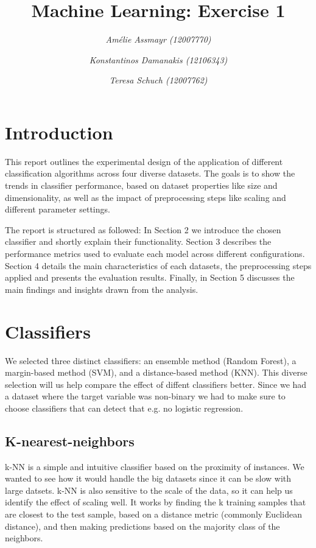 \documentclass{article}
\title{\textbf{Machine Learning: Exercise 1}}
\author{\textit{Amélie Assmayr (12007770)} \and
        \textit{Konstantinos Damanakis (12106343)} \and
        \textit{Teresa Schuch (12007762)}}
\date{}
\begin{document}
\maketitle
\vspace{-20pt}

\section{Introduction}
This report outlines the experimental design of the application of different classification algorithms across four diverse datasets. The goals is to show the trends in classifier performance, based on dataset properties like size and dimensionality, as well as the impact of preprocessing steps like scaling and different parameter settings.

The report is structured as followed: In Section 2 we introduce the chosen classifier and shortly explain their functionality. Section 3 describes the performance metrics used to evaluate each model across different configurations. Section 4 details the main characteristics of each datasets, the preprocessing steps applied and presents the evaluation results. Finally, in Section 5 discusses the main findings and insights drawn from the analysis.

\section{Classifiers}
We selected three distinct classifiers: an ensemble method (Random Forest), a margin-based method (SVM), and a distance-based method (KNN). This diverse selection will us help compare the effect of diffent classifiers better. Since we had a dataset where the target variable was non-binary we had to make sure to choose classifiers that can detect that e.g. no logistic regression.

\subsection{K-nearest-neighbors}
k-NN is a simple and intuitive classifier based on the proximity of instances. We wanted to see how it would handle the big datasets since it can be slow with large datsets. k-NN is also sensitive to the scale of the data, so it can help us identify the effect of scaling well. It works by finding the k training samples that are closest to the test sample, based on a distance metric (commonly Euclidean distance), and then making predictions based on the majority class of the neighbors.
\end{document}
